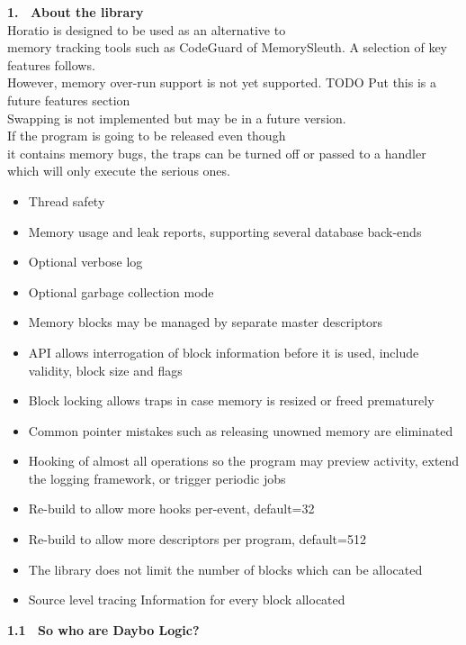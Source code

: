 \documentclass{article}
\begin{document}
\newpage
\textbf{1.~ About the library}
\\
Horatio is designed to be used as an alternative to
\\
memory tracking tools such as CodeGuard of MemorySleuth.  A selection of key features follows.
\\
However, memory over-run support is not yet supported. TODO Put this is a future features section
\\
Swapping is not implemented but may be in a future version.\\
If the program is going to be released even though
\\
it contains memory bugs, the traps can be turned off or passed to
a handler which will only execute the serious ones.
\\
\begin{itemize}
\item Thread safety
\item Memory usage and leak reports, supporting several database back-ends
\item Optional verbose log
\item Optional garbage collection mode
\item Memory blocks may be managed by separate master descriptors
\item API allows interrogation of block information before it is used, include validity, block size and flags
\item Block locking allows traps in case memory is resized or freed prematurely
\item Common pointer mistakes such as releasing unowned memory are eliminated
\item Hooking of almost all operations so the program may preview activity, extend the logging framework, or trigger periodic jobs
\item Re-build to allow more hooks per-event, default=32
\item Re-build to allow more descriptors per program, default=512
\item The library does not limit the number of blocks which can be allocated
\item Source level tracing Information for every block allocated
\end{itemize}
\textbf{1.1~ So who are Daybo Logic?}
\end{document}
